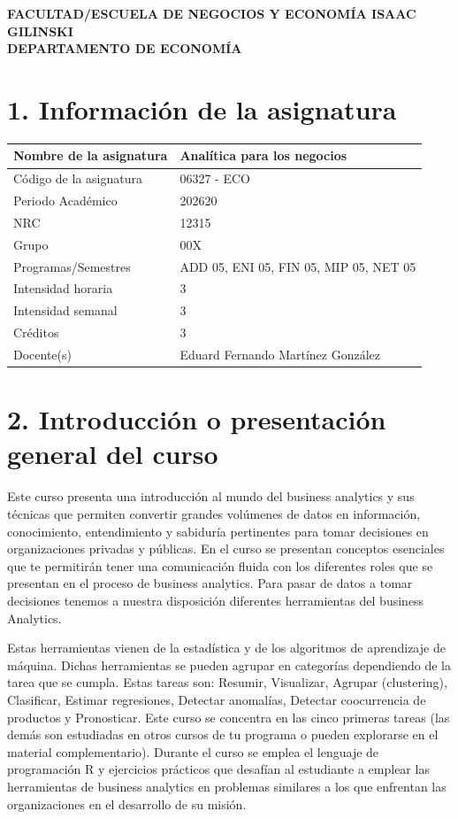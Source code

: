 \documentclass[11pt,a4paper]{article}
\begin{document}
\begin{center}
{\Large \textbf{FACULTAD/ESCUELA DE NEGOCIOS Y ECONOMÍA ISAAC GILINSKI}}\\
\textbf{DEPARTAMENTO DE ECONOMÍA}
\end{center}

\vspace{0.5cm}

\section*{1. Información de la asignatura}

\begin{tabular}{|p{6cm}|p{9cm}|}
\hline
Nombre de la asignatura & Analítica para los negocios \\ \hline
Código de la asignatura & 06327 - ECO \\ \hline
Periodo Académico & 202620 \\ \hline
NRC & 12315 \\ \hline
Grupo & 00X \\ \hline
Programas/Semestres & ADD 05, ENI 05, FIN 05, MIP 05, NET 05 \\ \hline
Intensidad horaria & 3 \\ \hline
Intensidad semanal & 3 \\ \hline
Créditos & 3 \\ \hline
Docente(s) &  Eduard Fernando Martínez González \\ \hline
\end{tabular}

\section*{2. Introducción o presentación general del curso}

Este curso presenta una introducción al mundo del business analytics y sus técnicas que permiten convertir grandes volúmenes de datos en información, conocimiento, entendimiento y sabiduría pertinentes para tomar decisiones en organizaciones privadas y públicas. En el curso se presentan conceptos esenciales que te permitirán tener una comunicación fluida con los diferentes roles que se presentan en el proceso de business analytics. Para pasar de datos a tomar decisiones tenemos a nuestra disposición diferentes herramientas del business Analytics.

\vspace{0.3cm}

Estas herramientas vienen de la estadística y de los algoritmos de aprendizaje de máquina. Dichas herramientas se pueden agrupar en categorías dependiendo de la tarea que se cumpla. Estas tareas son: Resumir, Visualizar, Agrupar (clustering), Clasificar, Estimar regresiones, Detectar anomalías, Detectar coocurrencia de productos y Pronosticar. Este curso se concentra en las cinco primeras tareas (las demás son estudiadas en otros cursos de tu programa o pueden explorarse en el material complementario). Durante el curso se emplea el lenguaje de programación R y ejercicios prácticos que desafían al estudiante a emplear las herramientas de business analytics en problemas similares a los que enfrentan las organizaciones en el desarrollo de su misión.
\end{document}
